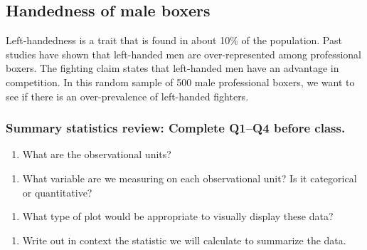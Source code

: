 \documentclass[
]{report}
\providecommand{\tightlist}{%
  \setlength{\itemsep}{0pt}\setlength{\parskip}{0pt}}
\begin{document}
\newpage

\hypertarget{handedness-of-male-boxers}{%
\subsection{Handedness of male boxers}\label{handedness-of-male-boxers}}

Left-handedness is a trait that is found in about 10\% of the population. Past studies have shown that left-handed men are over-represented among professional boxers. The fighting claim states that left-handed men have an advantage in competition. In this random sample of 500 male professional boxers, we want to see if there is an over-prevalence of left-handed fighters.

\hypertarget{summary-statistics-review-complete-q1q4-before-class.}{%
\subsubsection*{Summary statistics review: Complete Q1--Q4 before class.}\label{summary-statistics-review-complete-q1q4-before-class.}}

\begin{enumerate}
\def\labelenumi{\arabic{enumi}.}
\tightlist
\item
  What are the observational units?
\end{enumerate}

\vspace{0.5in}

\begin{enumerate}
\def\labelenumi{\arabic{enumi}.}
\setcounter{enumi}{1}
\tightlist
\item
  What variable are we measuring on each observational unit? Is it categorical or quantitative?
\end{enumerate}

\vspace{0.5in}

\begin{enumerate}
\def\labelenumi{\arabic{enumi}.}
\setcounter{enumi}{2}
\tightlist
\item
  What type of plot would be appropriate to visually display these data?
\end{enumerate}

\vspace{0.5in}

\begin{enumerate}
\def\labelenumi{\arabic{enumi}.}
\setcounter{enumi}{3}
\tightlist
\item
  Write out in context the statistic we will calculate to summarize the data.
\end{enumerate}
\end{document}
